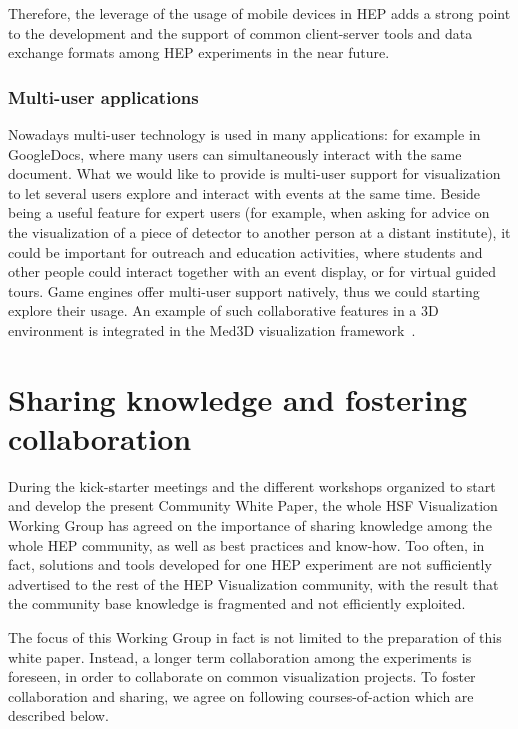 \documentclass[12pt,a4paper]{article}
\begin{document}
Therefore, the leverage of the usage of mobile devices in HEP adds a strong point to the development and the support of common
client-server tools and data exchange formats among HEP experiments in the near future.

\hypertarget{multi-user}{%
\subsubsection{Multi-user applications}\label{multi-user}}

Nowadays multi-user technology is used in many applications: for example in GoogleDocs, where many users can simultaneously
interact with the same document. What we would like to provide is multi-user support for visualization to let several users
explore and interact with events at the same time. Beside being a useful feature for expert users (for example, when asking for advice on the visualization of a piece of detector to another person at a distant institute), it could be important for
outreach and education activities, where students and other people could interact together with an event display, or for virtual guided tours.
Game engines offer multi-user support natively, thus we could starting explore their usage.
An example of such collaborative features in a 3D environment is integrated in the Med3D visualization framework~\cite{Bohak2017}.

\hypertarget{sharing-knowledge}{%
\section{Sharing knowledge and fostering collaboration}\label{sharing-knowledge}}

During the kick-starter meetings and the different workshops organized to start and develop the present Community White Paper,
the whole HSF Visualization Working Group has agreed on the importance of sharing knowledge among the whole HEP community,
as well as best practices and know-how. Too often, in fact, solutions and tools developed for one HEP experiment are
not sufficiently advertised to the rest of the HEP Visualization community, with the result that the community base knowledge
is fragmented and not efficiently exploited.

The focus of this Working Group in fact is not limited to the preparation of this white paper. Instead, a longer term collaboration
among the experiments is foreseen, in order to collaborate on common visualization projects.
To foster collaboration and sharing, we agree on following courses-of-action which are described below.
\end{document}
